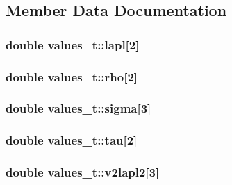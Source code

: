 \subsection{Member Data Documentation}
\hypertarget{structvalues__t_a29ad52e389047ae3f032fe9a01e1939a}{
\subsubsection[{lapl}]{\setlength{\rightskip}{0pt plus 5cm}double values\-\_\-t\-::lapl\mbox{[}2\mbox{]}}}\label{structvalues__t_a29ad52e389047ae3f032fe9a01e1939a}
\hypertarget{structvalues__t_a653ca8dceaf2c047aa741beb1c0133c1}{
\subsubsection[{rho}]{\setlength{\rightskip}{0pt plus 5cm}double values\-\_\-t\-::rho\mbox{[}2\mbox{]}}}\label{structvalues__t_a653ca8dceaf2c047aa741beb1c0133c1}
\hypertarget{structvalues__t_a01a71f7a76c5619239644df2a6667196}{
\subsubsection[{sigma}]{\setlength{\rightskip}{0pt plus 5cm}double values\-\_\-t\-::sigma\mbox{[}3\mbox{]}}}\label{structvalues__t_a01a71f7a76c5619239644df2a6667196}
\hypertarget{structvalues__t_a3c9ead343c372876f2527265817fc557}{
\subsubsection[{tau}]{\setlength{\rightskip}{0pt plus 5cm}double values\-\_\-t\-::tau\mbox{[}2\mbox{]}}}\label{structvalues__t_a3c9ead343c372876f2527265817fc557}
\hypertarget{structvalues__t_a580e4d8db71e41ed160e67dbb5402a59}{
\subsubsection[{v2lapl2}]{\setlength{\rightskip}{0pt plus 5cm}double values\-\_\-t\-::v2lapl2\mbox{[}3\mbox{]}}}\label{structvalues__t_a580e4d8db71e41ed160e67dbb5402a59}
